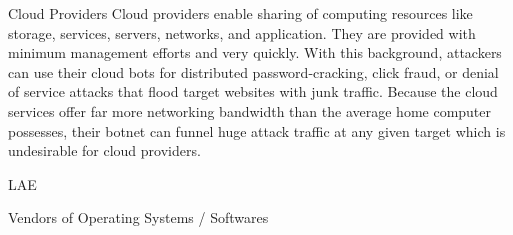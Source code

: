 \label{cap:sec4}


Cloud Providers
Cloud  providers enable sharing of computing resources like storage, services, servers, networks, and application. They are provided with minimum management efforts and very quickly. With this background, attackers can use their cloud bots for distributed password-cracking, click fraud, or denial of service attacks that flood target websites with junk traffic. Because the cloud services offer far more networking bandwidth than the average home computer possesses, their botnet can funnel huge attack traffic at any given target which is undesirable for cloud providers.

LAE

Vendors of Operating Systems / Softwares
